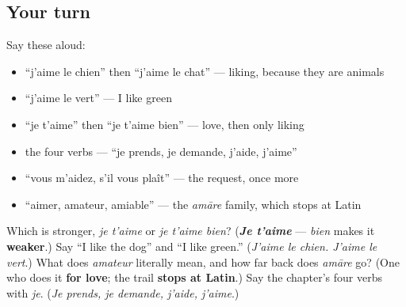 \subsection*{Your turn}
Say these aloud:

\begin{itemize}
\raggedright
  \item \textquotedblleft{}j'aime le chien\textquotedblright{} then \textquotedblleft{}j'aime le chat\textquotedblright{} — liking, because they are animals
  \item \textquotedblleft{}j'aime le vert\textquotedblright{} — I like green
  \item \textquotedblleft{}je t'aime\textquotedblright{} then \textquotedblleft{}je t'aime bien\textquotedblright{} — love, then only liking
  \item the four verbs — \textquotedblleft{}je prends, je demande, j'aide, j'aime\textquotedblright{}
  \item \textquotedblleft{}vous m'aidez, s'il vous plaît\textquotedblright{} — the request, once more
  \item \textquotedblleft{}aimer, amateur, amiable\textquotedblright{} — the \emph{amāre} family, which stops at Latin
\end{itemize}

\begin{tcolorbox}[breakable,colback=teal!4,colframe=teal!35!black,title={Before you move on}]
Which is stronger, \emph{je t'aime} or \emph{je t'aime bien}? (\emph{\textbf{Je t'aime}} — \emph{bien} makes it \textbf{weaker}.) Say \textquotedblleft{}I like the dog\textquotedblright{} and \textquotedblleft{}I like green.\textquotedblright{} (\emph{J'aime le chien. J'aime le vert}.) What does \emph{amateur} literally mean, and how far back does \emph{amāre} go? (One who does it \textbf{for love}; the trail \textbf{stops at Latin}.) Say the chapter's four verbs with \emph{je}. (\emph{Je prends, je demande, j'aide, j'aime}.)
\end{tcolorbox}
